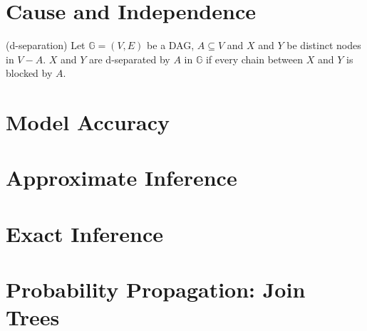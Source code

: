 \documentclass[12pt,twoside]{article}
\begin{document}
\section{Cause and Independence}

(d-separation) Let $\mathbb{G}=(V,E)$ be a DAG, $A\subseteq V$ and $X$ and $Y$ be distinct nodes in $V-A$. $X$ and $Y$ are d-separated by $A$ in $\mathbb{G}$ if every chain between $X$ and $Y$ is blocked by $A$.


\section{Model Accuracy}

\section{Approximate Inference}

\section{Exact Inference}

\section{Probability Propagation: Join Trees}
\end{document}
